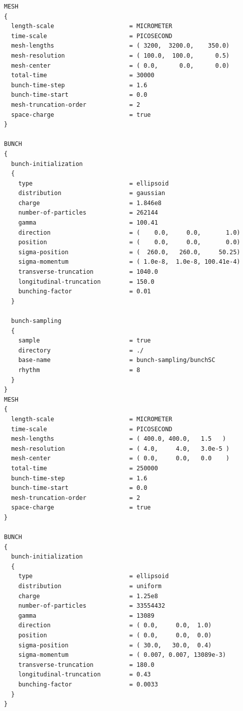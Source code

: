 \begin{snugshade}
\begin{Verbatim}[fontsize=\small, tabsize = 4]
MESH
{
  length-scale                     = MICROMETER
  time-scale                       = PICOSECOND
  mesh-lengths                     = ( 3200,  3200.0,    350.0)
  mesh-resolution                  = ( 100.0,  100.0,      0.5)
  mesh-center                      = ( 0.0,      0.0,      0.0)
  total-time                       = 30000
  bunch-time-step                  = 1.6
  bunch-time-start                 = 0.0
  mesh-truncation-order            = 2
  space-charge                     = true
}

BUNCH
{
  bunch-initialization
  {
    type                           = ellipsoid
    distribution                   = gaussian
    charge                         = 1.846e8
    number-of-particles            = 262144
    gamma                          = 100.41
    direction                      = (    0.0,     0.0,       1.0)
    position                       = (    0.0,     0.0,       0.0)
    sigma-position                 = (  260.0,   260.0,     50.25)
    sigma-momentum                 = ( 1.0e-8,  1.0e-8, 100.41e-4)
    transverse-truncation          = 1040.0
    longitudinal-truncation        = 150.0
    bunching-factor                = 0.01
  }

  bunch-sampling
  {
    sample                         = true
    directory                      = ./
    base-name                      = bunch-sampling/bunchSC
    rhythm                         = 8
  }
}
MESH
{
  length-scale                     = MICROMETER
  time-scale                       = PICOSECOND
  mesh-lengths                     = ( 400.0, 400.0,   1.5   )
  mesh-resolution                  = ( 4.0,     4.0,   3.0e-5 )
  mesh-center                      = ( 0.0,     0.0,   0.0    )
  total-time                       = 250000
  bunch-time-step                  = 1.6
  bunch-time-start                 = 0.0
  mesh-truncation-order            = 2
  space-charge                     = true
}

BUNCH
{
  bunch-initialization
  {
    type                           = ellipsoid
    distribution                   = uniform
    charge                         = 1.25e8
    number-of-particles            = 33554432
    gamma                          = 13089
    direction                      = ( 0.0,     0.0,  1.0)
    position                       = ( 0.0,     0.0,  0.0)
    sigma-position                 = ( 30.0,   30.0,  0.4)
    sigma-momentum                 = ( 0.007, 0.007, 13089e-3)
    transverse-truncation          = 180.0
    longitudinal-truncation        = 0.43
    bunching-factor                = 0.0033
  }
}


\end{Verbatim}
\end{snugshade}
